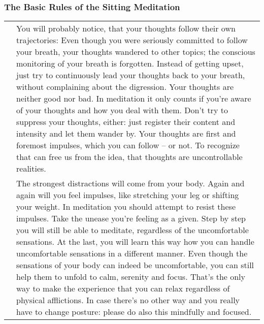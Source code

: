 \documentclass[../main.tex]{subfiles}
\begin{document}
 \subsubsection{The Basic Rules of the Sitting Meditation}

 \begin{tabular}{p{1.8cm} p{9.7cm} }
   \raisebox{-1\totalheight}{\texttt{[image: Thinking\_man\_thoughts]}}
   &
You will probably notice, that your {thoughts follow their own trajectories}: Even though you were seriously committed to  follow your breath, your {thoughts wandered} to other topics;
the conscious monitoring of your breath is forgotten.
Instead of getting upset, just try to continuously {lead your thoughts back to your breath}, without complaining about the digression.
Your thoughts are neither good nor bad.
In meditation it only counts if you’re {aware of your thoughts and how you deal with them}.
Don't try to suppress your thoughts, either: just {register their content and intensity} and let them {wander} by. 
Your thoughts are first and foremost {impulses, which you can follow} -- or not.
To recognize that can free us from the idea, that thoughts are uncontrollable realities.
   \\
   \raisebox{-1\totalheight}{\texttt{[image: Thinking\_man\_body]}}
   &
The strongest distractions will come from your body.\index{meditation!distraction}
Again and again will you feel impulses, like stretching your leg or shifting your weight.
In meditation you should attempt to {resist these impulses}.
Take the {unease you're feeling as a given}.
Step by step you will still be able to meditate, regardless of the uncomfortable sensations.
     At the last, you will learn this way how you can handle uncomfortable sensations  in a different manner.
     Even though the sensations of your body can indeed be {uncomfortable}, you can still help them to unfold to {calm, serenity and focus}.
     That's the only way to make the experience that {you can relax regardless of physical afflictions}.\index{unease!cope}
     In case there's no other way and you really have to change posture: please do also this mindfully and focused.
 \end{tabular}
\end{document}
